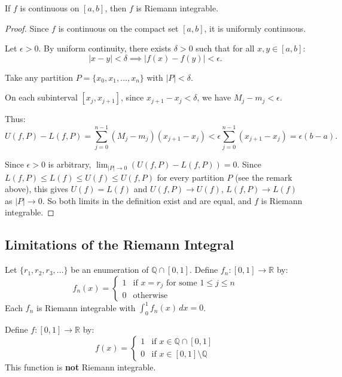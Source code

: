 \documentclass[11pt]{report}
\begin{document}
\begin{propbox}
If $f$ is continuous on $[a, b]$, then $f$ is Riemann integrable.
\end{propbox}

\begin{proof}
Since $f$ is continuous on the compact set $[a, b]$, it is uniformly continuous.

Let $\epsilon > 0$. By uniform continuity, there exists $\delta > 0$ such that for all $x, y \in [a, b]$:
\[
|x - y| < \delta \implies |f(x) - f(y)| < \epsilon.
\]

Take any partition $P = \{x_0, x_1, \ldots, x_n\}$ with $|P| < \delta$.

On each subinterval $[x_j, x_{j+1}]$, since $x_{j+1} - x_j < \delta$, we have $M_j - m_j < \epsilon$.

Thus:
\[
U(f, P) - L(f, P) = \sum_{j=0}^{n-1} (M_j - m_j)(x_{j+1} - x_j) < \epsilon \sum_{j=0}^{n-1} (x_{j+1} - x_j) = \epsilon(b - a).
\]

Since $\epsilon > 0$ is arbitrary, $\lim_{|P| \to 0} (U(f, P) - L(f, P)) = 0$. Since $L(f, P) \leq L(f) \leq U(f) \leq U(f, P)$ for every partition $P$ (see the remark above), this gives $U(f) = L(f)$ and $U(f, P) \to U(f)$, $L(f, P) \to L(f)$ as $|P| \to 0$. So both limits in the definition exist and are equal, and $f$ is Riemann integrable.
\end{proof}

\subsection{Limitations of the Riemann Integral}

\begin{exbox}
Let $\{r_1, r_2, r_3, \ldots\}$ be an enumeration of $\mathbb{Q} \cap [0, 1]$. Define $f_n: [0, 1] \to \mathbb{R}$ by:
\[
f_n(x) = \begin{cases}
1 & \text{if } x = r_j \text{ for some } 1 \leq j \leq n \\
0 & \text{otherwise}
\end{cases}
\]
Each $f_n$ is Riemann integrable with $\int_0^1 f_n(x) \, dx = 0$.
\end{exbox}

\begin{exbox}
Define $f: [0, 1] \to \mathbb{R}$ by:
\[
f(x) = \begin{cases}
1 & \text{if } x \in \mathbb{Q} \cap [0, 1] \\
0 & \text{if } x \in [0, 1] \setminus \mathbb{Q}
\end{cases}
\]
This function is \textbf{not} Riemann integrable.
\end{exbox}
\end{document}
